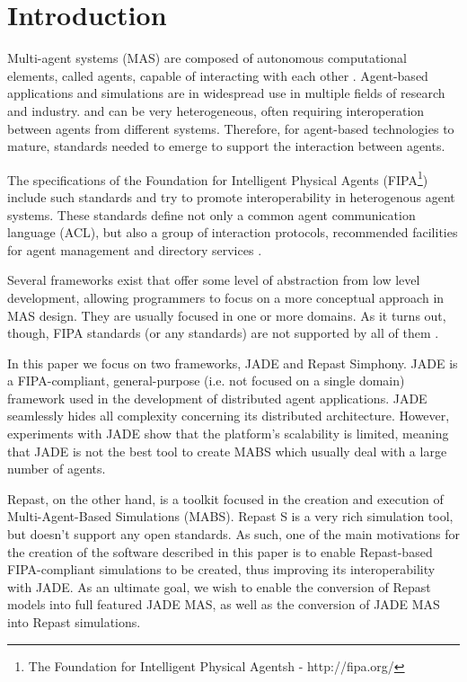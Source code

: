 \section{Introduction} %
\label{sec:introduction}

Multi-agent systems (MAS) are composed of autonomous computational elements, called agents, capable of interacting with each other \cite{wooldridge2008introduction}. Agent-based applications and simulations are in widespread use in multiple fields of research and industry.  and can be very heterogeneous, often requiring interoperation between agents from different systems.  Therefore, for agent-based technologies to mature, standards needed to emerge to support the interaction between agents.

The specifications of the Foundation for Intelligent Physical Agents (FIPA\footnote{The Foundation for Intelligent Physical Agentsh - http://fipa.org/}) include such standards and try to promote interoperability in heterogenous agent systems. These standards define not only a common agent communication language (ACL), but also a group of interaction protocols, recommended facilities for agent management and directory services \cite{o1998fipa}.

Several frameworks exist that offer some level of abstraction from low level development, allowing programmers to focus on a more conceptual approach in MAS design. They are usually focused in one or more domains. As it turns out, though, FIPA standards (or any standards) are not supported by all of them \cite{survey}.

In this paper we focus on two frameworks, JADE and Repast Simphony. JADE is a FIPA-compliant, general-purpose (i.e. not focused on a single domain) framework used in the development of distributed agent applications. JADE seamlessly hides all complexity concerning its distributed architecture. \cite{bellifemine2003jade} However, experiments with JADE show that the platform's scalability is limited, meaning that JADE is not the best tool to create MABS which usually deal with a large number of agents. \cite{mengistu2008scalability} \cite{garcia2011misia}

Repast, on the other hand, is a toolkit focused in the creation and execution of Multi-Agent-Based Simulations (MABS). Repast S is a very rich simulation tool, but doesn't support any open standards. \cite{collier2003repast} As such, one of the main motivations for the creation of the software described in this paper is to enable Repast-based FIPA-compliant simulations to be created, thus improving its interoperability with JADE. As an ultimate goal, we wish to enable the conversion of Repast models into full featured JADE MAS, as well as the conversion of JADE MAS into Repast simulations.

